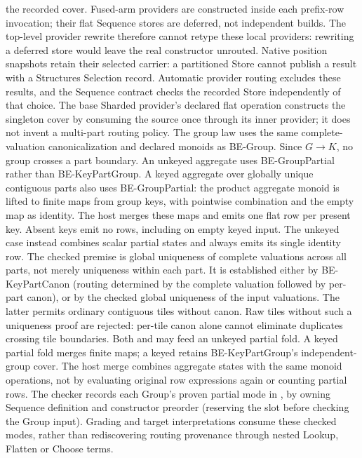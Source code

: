 the recorded cover. Fused-arm providers are constructed inside each prefix-row
invocation; their flat Sequence stores are deferred, not independent builds.
The top-level provider rewrite therefore cannot retype these local providers:
rewriting a deferred store would leave the real constructor unrouted.
Native position snapshots retain their selected carrier: a partitioned Store
cannot publish a result with a Structures Selection record. Automatic provider
routing excludes these results, and the Sequence contract checks the recorded
Store independently of that choice. The base Sharded provider's declared flat
 operation constructs the singleton cover by consuming the source
once through its inner provider; it does not invent a multi-part routing policy.
The group law uses the same complete-valuation canonicalization and declared
monoids as BE-Group. Since $G\to K$, no group crosses a part boundary.
An unkeyed aggregate uses BE-GroupPartial rather than BE-KeyPartGroup.
A keyed aggregate over globally unique contiguous parts also uses
BE-GroupPartial: the product aggregate monoid is lifted to finite maps from
group keys, with pointwise combination and the empty map as identity.
The host merges these maps and emits one flat row per present key. Absent
keys emit no rows, including on empty keyed input. The unkeyed case instead
combines scalar partial states and always emits its single identity row.
The checked premise is global uniqueness of complete valuations across
all parts, not merely uniqueness within each part. It is established either
by BE-KeyPartCanon (routing determined by the complete valuation followed
by per-part canon), or by the checked global uniqueness of the input
valuations. The latter permits ordinary contiguous tiles without canon.
Raw tiles without such a uniqueness proof are rejected: per-tile
canon alone cannot eliminate duplicates crossing tile boundaries.
Both  and  may feed an unkeyed partial fold.
A keyed  partial fold merges finite maps; a keyed
 retains BE-KeyPartGroup's independent-group cover.
The host merge combines aggregate states with the same monoid operations,
not by evaluating original row expressions again or counting partial rows.
The checker records each Group's proven partial mode in
, by owning Sequence definition and constructor
preorder (reserving the slot before checking the Group input).
Grading and target interpretations consume these checked modes, rather than
rediscovering routing provenance through nested Lookup, Flatten or Choose terms.
